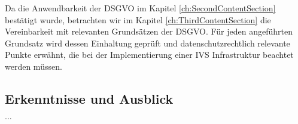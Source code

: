 Da die Anwendbarkeit der DSGVO im Kapitel \ref{ch:SecondContentSection} bestätigt wurde, betrachten wir im Kapitel \ref{ch:ThirdContentSection} die Vereinbarkeit mit relevanten Grundsätzen der DSGVO. Für jeden angeführten Grundsatz wird dessen Einhaltung geprüft und datenschutzrechtlich relevante Punkte erwähnt, die bei der Implementierung einer IVS Infrastruktur beachtet werden müssen.


\subsection{Erkenntnisse und Ausblick}

$\dots$